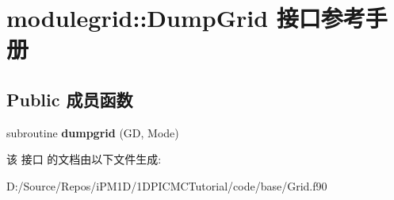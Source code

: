 \hypertarget{interfacemodulegrid_1_1_dump_grid}{}\section{modulegrid\+::Dump\+Grid 接口参考手册}
\label{interfacemodulegrid_1_1_dump_grid}
\subsection*{Public 成员函数}
\begin{DoxyCompactItemize}
\item 
\mbox{\label{interfacemodulegrid_1_1_dump_grid_a0aaecd96639fdf578bab1aefb2f1dbef}} 
subroutine {\bfseries dumpgrid} (GD, Mode)
\end{DoxyCompactItemize}


该 接口 的文档由以下文件生成\+:\begin{DoxyCompactItemize}
\item 
D\+:/\+Source/\+Repos/i\+P\+M1\+D/1\+D\+P\+I\+C\+M\+C\+Tutorial/code/base/Grid.\+f90\end{DoxyCompactItemize}
